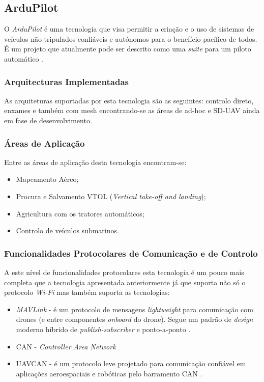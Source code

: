 \subsection{ArduPilot}
O \textit{ArduPilot} é uma tecnologia que visa permitir a criação e o uso de sistemas de veículos não tripulados confiáveis e autónomos para o benefício pacífico de todos. É um projeto que atualmente pode ser descrito como uma \textit{suite} para um piloto automático \cite{ArduPilotCommunity}.

\subsubsection{Arquitecturas Implementadas}

As arquiteturas suportadas por esta tecnologia são as seguintes: controlo direto, enxames e também com mesh encontrando-se as áreas de ad-hoc e SD-UAV ainda em fase de desenvolvimento.

\subsubsection{Áreas de Aplicação}

Entre as áreas de aplicação desta tecnologia encontram-se:
\begin{itemize}
    \item {Mapeamento Aéreo;}
    \item Procura e Salvamento VTOL (\textit{Vertical take-off and landing});
    \item Agricultura com os tratores automáticos;
    \item Controlo de veículos submarinos.
\end{itemize}

\subsubsection{Funcionalidades Protocolares de Comunicação e de Controlo}

A este nível de funcionalidades protocolares esta tecnologia é um pouco mais completa que a tecnologia apresentada anteriormente já que suporta não só o protocolo \textit{Wi-Fi} mas também suporta as tecnologias:
\begin{itemize}
    \item \textit{MAVLink} - é um protocolo de mensagens \textit{lightweight} para comunicação com drones (e entre componentes \textit{onboard} do drone). Segue um padrão de \textit{design} moderno híbrido de \textit{publish-subscriber} e ponto-a-ponto \cite{DronecodeProject}.
    \item CAN - \textit{Controller Area Network}
    \item UAVCAN - é um protocolo leve projetado para comunicação confiável em aplicações aeroespaciais e robóticas pelo barramento CAN \cite{UAVCANdevelopmentteam}.
\end{itemize}

